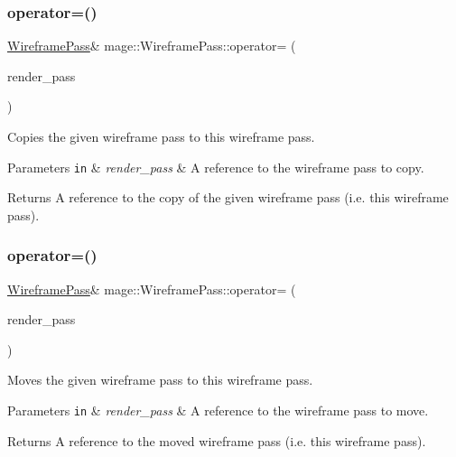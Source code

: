 \subsubsection{\texorpdfstring{operator=()}{operator=()}\hspace{0.1cm}{\footnotesize\ttfamily [1/2]}}
{\footnotesize\ttfamily \hyperlink{classmage_1_1_wireframe_pass}{Wireframe\+Pass}\& mage\+::\+Wireframe\+Pass\+::operator= (\begin{DoxyParamCaption}\item[{const \hyperlink{classmage_1_1_wireframe_pass}{Wireframe\+Pass} \&}]{render\+\_\+pass }\end{DoxyParamCaption})\hspace{0.3cm}{\ttfamily [delete]}}

Copies the given wireframe pass to this wireframe pass.


\begin{DoxyParams}[1]{Parameters}
\mbox{\tt in}  & {\em render\+\_\+pass} & A reference to the wireframe pass to copy. \\
\hline
\end{DoxyParams}
\begin{DoxyReturn}{Returns}
A reference to the copy of the given wireframe pass (i.\+e. this wireframe pass). 
\end{DoxyReturn}
\hypertarget{classmage_1_1_wireframe_pass_abd90640d63b9ce0c44b87de87d06910c}{}\label{classmage_1_1_wireframe_pass_abd90640d63b9ce0c44b87de87d06910c} 
\subsubsection{\texorpdfstring{operator=()}{operator=()}\hspace{0.1cm}{\footnotesize\ttfamily [2/2]}}
{\footnotesize\ttfamily \hyperlink{classmage_1_1_wireframe_pass}{Wireframe\+Pass}\& mage\+::\+Wireframe\+Pass\+::operator= (\begin{DoxyParamCaption}\item[{\hyperlink{classmage_1_1_wireframe_pass}{Wireframe\+Pass} \&\&}]{render\+\_\+pass }\end{DoxyParamCaption})\hspace{0.3cm}{\ttfamily [delete]}}

Moves the given wireframe pass to this wireframe pass.


\begin{DoxyParams}[1]{Parameters}
\mbox{\tt in}  & {\em render\+\_\+pass} & A reference to the wireframe pass to move. \\
\hline
\end{DoxyParams}
\begin{DoxyReturn}{Returns}
A reference to the moved wireframe pass (i.\+e. this wireframe pass). 
\end{DoxyReturn}
\hypertarget{classmage_1_1_wireframe_pass_abeae5404241fd4bb29d971a97cbcc44b}{}\label{classmage_1_1_wireframe_pass_abeae5404241fd4bb29d971a97cbcc44b} 
